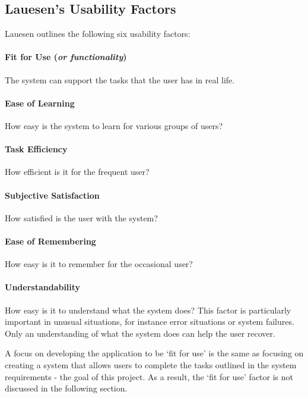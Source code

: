 \subsection{Lauesen's Usability Factors}

Lauesen \cite{lauesen} outlines the following six usability factors:

    \paragraph{Fit for Use (\textit{or functionality})} The system can support the tasks that the user has in real life.
    
    \paragraph{Ease of Learning} How easy is the system to learn for various groups of users?
    
    \paragraph{Task Efficiency} How efficient is it for the frequent user?
    
    \paragraph{Subjective Satisfaction} How satisfied is the user with the system?
    
    \paragraph{Ease of Remembering} How easy is it to remember for the occasional user?
    
    \paragraph{Understandability} How easy is it to understand what the system does? This
    factor is particularly important in unusual situations, for instance error situations
    or system failures. Only an understanding of what the system does can help the
    user recover.

A focus on developing the application to be `fit for use' is the same as focusing on creating a system that allows users to complete the tasks outlined in the system requirements - the goal of this project. As a result, the `fit for use' factor is not discussed in the following section. 

